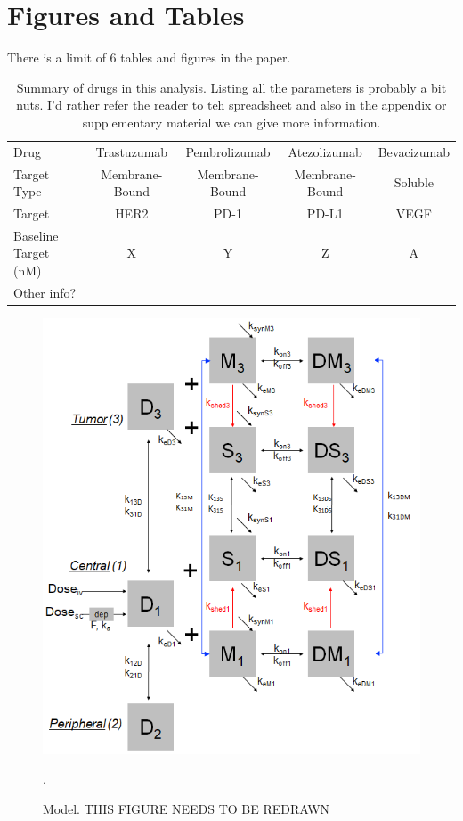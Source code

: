 \section{Figures and Tables}

There is a limit of 6 tables and figures in the paper.

\begin{table}[H]
\begin{center}
\begin{tabular}{ |l|c|c|c|c| } 
 \hline
 Drug & Trastuzumab & Pembrolizumab & Atezolizumab & Bevacizumab \\ 
 Target Type & Membrane-Bound & Membrane-Bound & Membrane-Bound & Soluble \\
 Target & HER2 & PD-1 & PD-L1 & VEGF \\ 
 Baseline Target (nM) & X & Y & Z & A \\ 
 Other info?\\
 \hline
\end{tabular}
\end{center}
\caption{Summary of drugs in this analysis.  Listing all the parameters is probably a bit nuts.  I'd rather refer the reader to teh spreadsheet and also in the appendix or supplementary material we can give more information.}
\end{table}

\begin{figure}[H]
\centering
\includegraphics[scale=0.45]{figures/3compartment_shed_traffic.png}
\caption{Model.  THIS FIGURE NEEDS TO BE REDRAWN 
\label{fig:model}}.
\end{figure}

